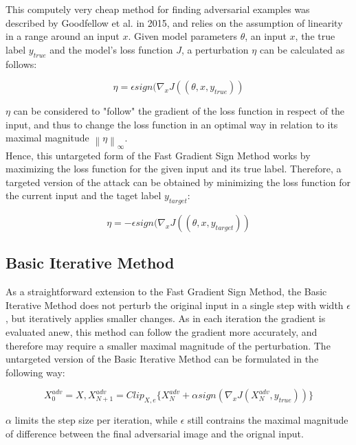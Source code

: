 \documentclass[draft,final]{vutinfth} %
\newcommand{\norm}[1]{\left\lVert#1\right\rVert}
\begin{document}
This computely very cheap method for finding adversarial examples was described by Goodfellow et al. in 2015, and relies on the assumption of linearity in a range around an input $x$.
Given model parameters $\theta$, an input $x$, the true label $y_{true}$ and the model's loss function $J$, a perturbation $\eta$ can be calculated as follows:

\begin{equation}
	\eta = \epsilon sign(\nabla_xJ((\theta, x, y_{true}))
\end{equation}

$\eta$ can be considered to "follow" the gradient of the loss function in respect of the input, and thus to change the loss function in an optimal way in relation to its maximal magnitude $\norm{\eta}_\infty$.
\\
Hence, this untargeted form of the Fast Gradient Sign Method works by maximizing the loss function for the given input and its true label.
Therefore, a targeted version of the attack can be obtained by minimizing the loss function for the current input and the taget label $y_{target}$:

\begin{equation}
	\eta = -\epsilon sign(\nabla_xJ((\theta, x, y_{target}))
\end{equation}
\cite{Goodfellow2015}

\subsection{Basic Iterative Method}

As a straightforward extension to the Fast Gradient Sign Method, the Basic Iterative Method does not perturb the original input in a single step with width $\epsilon$, but iteratively applies smaller changes. As in each iteration the gradient is evaluated anew, this method can follow the gradient more accurately, and therefore may require a smaller maximal magnitude of the perturbation. The untargeted version of the Basic Iterative Method can be formulated in the following way:

\begin{equation}
	X^{adv}_0 = X, X^{adv}_{N+1} = Clip_{X,e}\{X^{adv}_{N} + \alpha sign(\nabla_xJ(X^{adv}_{N}, y_{true})) \}
\end{equation}

$\alpha$ limits the step size per iteration, while $\epsilon$ still contrains the maximal magnitude of difference between the final adversarial image and the orignal input.
\end{document}
